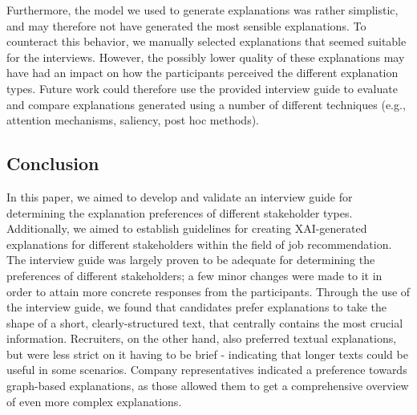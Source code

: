 Furthermore, the model we used to generate explanations was rather simplistic, and may therefore not have generated the most sensible explanations. To counteract this behavior, we manually selected explanations that seemed suitable for the interviews. However, the possibly lower quality of these explanations may have had an impact on how the participants perceived the different explanation types. Future work could therefore use the provided interview guide to evaluate and compare explanations generated using a number of different techniques (e.g., attention mechanisms, saliency, post hoc methods).


\subsection{Conclusion}
In this paper, we aimed to develop and validate an interview guide for determining the explanation preferences of different stakeholder types. Additionally, we aimed to establish guidelines for creating XAI-generated explanations for different stakeholders within the field of job recommendation. The interview guide was largely proven to be adequate for determining the preferences of different stakeholders; a few minor changes were made to it in order to attain more concrete responses from the participants. Through the use of the interview guide, we found that candidates prefer explanations to take the shape of a short, clearly-structured text, that centrally contains the most crucial information. Recruiters, on the other hand, also preferred textual explanations, but were less strict on it having to be brief - indicating that longer texts could be useful in some scenarios. Company representatives indicated a preference towards graph-based explanations, as those allowed them to get a comprehensive overview of even more complex explanations. 